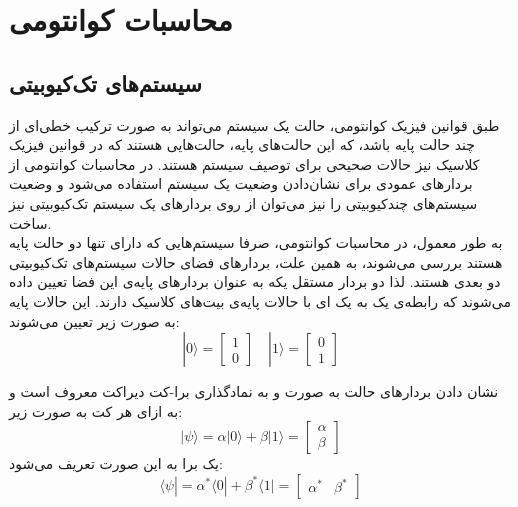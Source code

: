 

\section{محاسبات کوانتومی}

\subsection{سیستم‌های تک‌کیوبیتی}

طبق قوانین فیزیک کوانتومی، حالت یک سیستم می‌تواند به صورت ترکیب خطی‌ای از چند حالت پایه باشد، که این حالت‌های پایه، حالت‌هایی هستند که در قوانین فیزیک کلاسیک نیز حالات صحیحی برای توصیف سیستم هستند.
در محاسبات کوانتومی از بردارهای عمودی برای نشان‌دادن وضعیت یک سیستم استفاده می‌شود و وضعیت سیستم‌های چندکیوبیتی را نیز می‌توان از روی بردارهای یک سیستم تک‌کیوبیتی نیز ساخت.
\\
به طور معمول، در محاسبات کوانتومی، صرفا سیستم‌هایی که دارای تنها دو حالت پایه هستند بررسی می‌شوند، به همین علت، بردارهای فضای حالات سیستم‌های تک‌کیوبیتی دو بعدی هستند. لذا دو بردار مستقل یکه به عنوان بردارهای پایه‌ی این فضا تعیین داده می‌شوند که رابطه‌ی یک به یک ای با حالات پایه‌ی بیت‌های کلاسیک دارند.
این حالات پایه به صورت زیر تعیین می‌شوند:
\begin{equation}
    |0\rangle = \begin{bmatrix} 1 \\ 0 \end{bmatrix} 
    \mspace{18mu}
    |1\rangle = \begin{bmatrix} 0 \\ 1 \end{bmatrix}
\end{equation} 

نشان دادن بردارهای حالت به صورت 
\lr{$|0\rangle$} و \lr{$|1\rangle$}
به نمادگذاری برا-کت دیراکت
معروف است و به ازای هر کت
به صورت زیر:
\begin{equation}
    |\psi\rangle = \alpha |0\rangle + \beta |1\rangle
    = \begin{bmatrix}
    \alpha \\[3pt]
    \beta
    \end{bmatrix}
\end{equation}
یک برا
به این صورت تعریف می‌شود:
\begin{equation}
    \langle \psi| = \alpha^* \langle0| + \beta^* \langle1| = \begin{bmatrix} \alpha^* & \beta^* \end{bmatrix} 
\end{equation}

